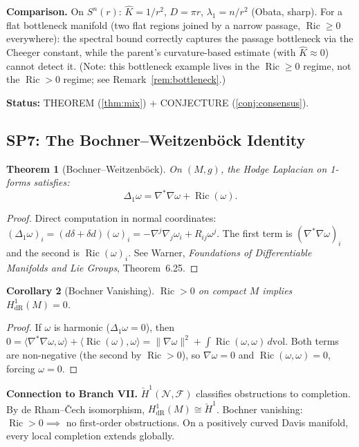 \documentclass[11pt]{article}
\newtheorem{theorem}{Theorem}[section]
\newtheorem{corollary}[theorem]{Corollary}
\theoremstyle{definition}
\theoremstyle{remark}
\newcommand{\Ric}{\operatorname{Ric}}
\newcommand{\dvol}{\,d\mathrm{vol}}
\begin{document}
\textbf{Comparison.} On $S^n(r)$: $\hat{K} = 1/r^2$, $D = \pi r$, $\lambda_1 = n/r^2$ (Obata, sharp). For a flat bottleneck manifold (two flat regions joined by a narrow passage, $\Ric \ge 0$ everywhere): the spectral bound correctly captures the passage bottleneck via the Cheeger constant, while the parent's curvature-based estimate (with $\hat{K} \approx 0$) cannot detect it. (Note: this bottleneck example lives in the $\Ric \ge 0$ regime, not the $\Ric > 0$ regime; see Remark~\ref{rem:bottleneck}.)

\textbf{Status:} THEOREM (\ref{thm:mix}) + CONJECTURE (\ref{conj:consensus}).


\subsection{SP7: The Bochner--Weitzenb\"{o}ck Identity}

\begin{theorem}[Bochner--Weitzenb\"{o}ck]\label{thm:bochner}
On $(M,g)$, the Hodge Laplacian on 1-forms satisfies:
\[
\Delta_1 \omega = \nabla^*\nabla\omega + \Ric(\omega).
\]
\end{theorem}

\begin{proof}
Direct computation in normal coordinates: $(\Delta_1\omega)_i = (d\delta + \delta d)(\omega)_i = -\nabla^j\nabla_j\omega_i + R_{ij}\omega^j$. The first term is $(\nabla^*\nabla\omega)_i$ and the second is $\Ric(\omega)_i$. See Warner, \emph{Foundations of Differentiable Manifolds and Lie Groups}, Theorem~6.25.
\end{proof}

\begin{corollary}[Bochner Vanishing]\label{cor:bochner}
$\Ric > 0$ on compact $M$ implies $H^1_{\mathrm{dR}}(M) = 0$.
\end{corollary}

\begin{proof}
If $\omega$ is harmonic ($\Delta_1\omega = 0$), then $0 = \langle\nabla^*\nabla\omega, \omega\rangle + \langle\Ric(\omega), \omega\rangle = \|\nabla\omega\|^2 + \int\Ric(\omega, \omega)\dvol$. Both terms are non-negative (the second by $\Ric > 0$), so $\nabla\omega = 0$ and $\Ric(\omega, \omega) = 0$, forcing $\omega = 0$.
\end{proof}

\textbf{Connection to Branch VII.} $\check{H}^1(\mathcal{N}, \mathcal{F})$ classifies obstructions to completion. By de Rham--\v{C}ech isomorphism, $H^1_{\mathrm{dR}}(M) \cong \check{H}^1$. Bochner vanishing: $\Ric > 0 \implies$ no first-order obstructions. On a positively curved Davis manifold, every local completion extends globally.
\end{document}
